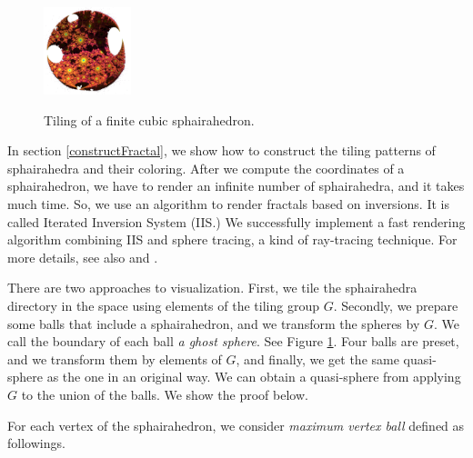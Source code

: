 \documentclass[suppldata, dvipdfmx]{interact}
\theoremstyle{plain}%
\theoremstyle{definition}
\theoremstyle{remark}
\theoremstyle{problemstyle}
\begin{document}
\begin{figure}[h!tbp]
\begin{minipage}[t]{0.18\textwidth}
  \label{fig:visualizeSpheresStep10}
 \end{minipage}
 \hspace*{\fill}
 \begin{minipage}[t]{0.18\textwidth}
  \centering
  \includegraphics[width=1in, height=1in, keepaspectratio]{./img/visualization/sphereFinal.jpg}
  \label{fig:visualizeSpheresFinal}
 \end{minipage}
 \hspace*{\fill}
 \caption{Tiling of a finite cubic sphairahedron.}
 \label{fig:visualizeSpheres}
\end{figure}

In section \ref{constructFractal}, we show how to construct the tiling
patterns of sphairahedra and their coloring.
After we compute the coordinates of a sphairahedron, we have to render an infinite number of
sphairahedra, and it takes much time.
So, we use an algorithm to render fractals based on
inversions. It is called Iterated Inversion System (IIS.)
We successfully implement a fast rendering algorithm
combining IIS and sphere tracing, a kind of ray-tracing technique.
For more details, see also \cite{bridges2017} and \cite{bridges2018}.

There are two approaches to visualization.
First, we tile the sphairahedra directory in the space using elements of the tiling group $G$.
Secondly, we prepare some balls that include a sphairahedron, and we transform the spheres by $G$. 
We call the boundary of each ball {\it a ghost sphere}.
See Figure \ref{fig:visualizeSpheres}.
Four balls are preset, and we transform them by elements of $G$, and finally, we get
the same quasi-sphere as the one in an original way.
We can obtain a quasi-sphere from applying $G$ to the union of the balls. 
We show the proof below.

For each vertex of the sphairahedron, we consider \textit{maximum vertex
ball} defined as followings.
\end{document}
